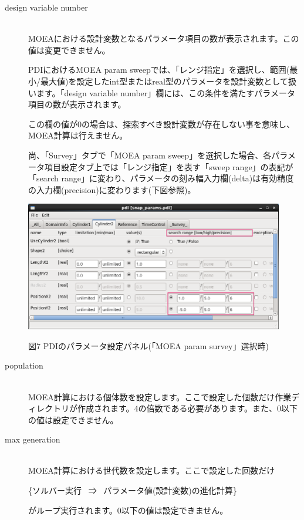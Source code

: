 \documentclass[a4paper,11pt]{jarticle}
\begin{document}
{\begin{description}
\item[design variable number] {\ }\\
MOEAにおける設計変数となるパラメータ項目の数が表示されます。この値は変更できません。

PDIにおけるMOEA param sweepでは、「レンジ指定」を選択し、範囲(最小/最大値)を設定したint型またはreal型のパラメータを設計変数として扱います。「design variable number」欄には、この条件を満たすパラメータ項目の数が表示されます。

この欄の値が0の場合は、探索すべき設計変数が存在しない事を意味し、MOEA計算は行えません。

尚、「Survey」タブで「MOEA param sweep」を選択した場合、各パラメータ項目設定タブ上では「レンジ指定」を表す「sweep range」の表記が「search range」に変わり、パラメータの刻み幅入力欄(delta)は有効精度の入力欄(precision)に変わります(下図参照)。

\begin{center}
\includegraphics[width=320pt, bb=0 0 856 429]{figs/fig006.png}

図7 PDIのパラメータ設定パネル(「MOEA param survey」選択時)
\end{center}

\item[population] {\ }\\
MOEA計算における個体数を設定します。ここで設定した個数だけ作業ディレクトリが作成されます。4の倍数である必要があります。また、0以下の値は設定できません。

\item[max generation] {\ }\\
MOEA計算における世代数を設定します。ここで設定した回数だけ\par
\begin{center}
\{ソルバー実行 \ ⇒ \ パラメータ値(設計変数)の進化計算\}
\end{center}\par
がループ実行されます。0以下の値は設定できません。


\end{description}}
\end{document}
